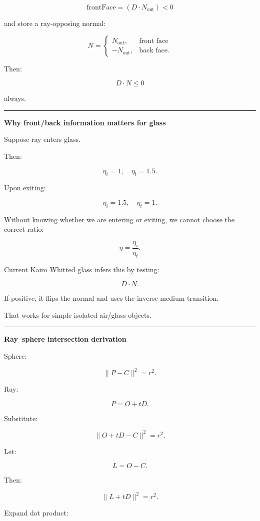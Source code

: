 \[
\boxed{
\text{frontFace}
=
(D\cdot N_{\text{out}})<0
}
\]

and store a ray-opposing normal:

\[
N=
\begin{cases}
N_{\text{out}}, & \text{front face}\\
-N_{\text{out}}, & \text{back face}.
\end{cases}
\]

Then:

\[
D\cdot N\le0
\]

always.

\begin{center}\rule{0.5\linewidth}{0.5pt}\end{center}

\textbf{Why front/back information matters for glass}

Suppose ray enters glass.

Then:

\[
\eta_i=1,
\quad
\eta_t=1.5.
\]

Upon exiting:

\[
\eta_i=1.5,
\quad
\eta_t=1.
\]

Without knowing whether we are entering or exiting, we cannot choose the correct ratio:

\[
\eta=
\frac{\eta_i}{\eta_t}.
\]

Current Kairo Whitted glass infers this by testing:

\[
D\cdot N.
\]

If positive, it flips the normal and uses the inverse medium transition.

That works for simple isolated air/glass objects.

\begin{center}\rule{0.5\linewidth}{0.5pt}\end{center}

\textbf{Ray--sphere intersection derivation}

Sphere:

\[
\|P-C\|^2=r^2.
\]

Ray:

\[
P=O+tD.
\]

Substitute:

\[
\|O+tD-C\|^2=r^2.
\]

Let:

\[
L=O-C.
\]

Then:

\[
\|L+tD\|^2=r^2.
\]

Expand dot product:

